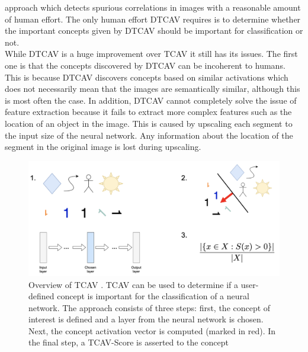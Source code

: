 \documentclass{article}
\begin{document}
approach which detects spurious correlations in images with a reasonable amount of human effort. The only human effort DTCAV requires is to determine
whether the important concepts given by DTCAV should be important for classification or not. \\
While DTCAV is a huge improvement over TCAV it still has its issues. The first one is that the concepts discovered by DTCAV can be incoherent to humans.
This is because DTCAV discovers concepts based on similar activations which does not necessarily mean that the images are semantically similar, although this
is most often the case. In addition, DTCAV cannot completely solve the issue of feature extraction because it fails to extract more complex features such as the
location of an object in the image. This is caused by upscaling each segment to the input size of the neural network. Any information about the location of the
segment in the original image is lost during upscaling.


\begin{figure}[!h]
    \centering
    \includegraphics[scale=0.45]{tcav.png}
    \caption{Overview of TCAV \cite{pmlr-v80-kim18d}. TCAV can be used to determine if a user-defined
    concept is important for the classification of a neural network. The approach consists of three steps: first,
    the concept of interest is defined and a layer from the neural network is chosen. Next, the concept activation
    vector is computed (marked in red). In the final step, a TCAV-Score is asserted to the concept}
    \label{fig:tcav}
\end{figure}
\end{document}
